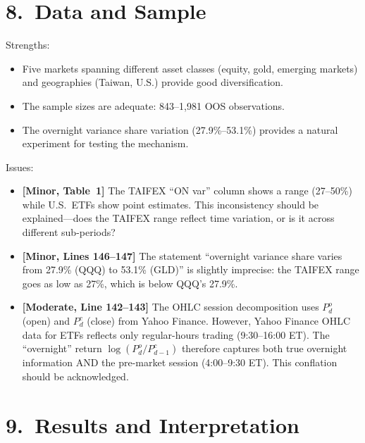 \documentclass[12pt,a4paper]{article}
\begin{document}
\bigskip

\section*{8.\ Data and Sample}

\noindent \textcolor{okgreen}{Strengths:}
\begin{itemize}[nosep]
\item Five markets spanning different asset classes (equity, gold, emerging markets) and geographies (Taiwan, U.S.) provide good diversification.
\item The sample sizes are adequate: 843--1,981 OOS observations.
\item The overnight variance share variation (27.9\%--53.1\%) provides a natural experiment for testing the mechanism.
\end{itemize}

\noindent Issues:
\begin{itemize}[nosep]
\item [L4] \textbf{[Minor, Table~1]} The TAIFEX ``ON var'' column shows a range (27--50\%) while U.S.\ ETFs show point estimates. This inconsistency should be explained---does the TAIFEX range reflect time variation, or is it across different sub-periods?
\item [L5] \textbf{[Minor, Lines 146--147]} The statement ``overnight variance share varies from 27.9\% (QQQ) to 53.1\% (GLD)'' is slightly imprecise: the TAIFEX range goes as low as 27\%, which is below QQQ's 27.9\%.
\item [\textcolor{warncolor}{M10}] \textbf{[Moderate, Line 142--143]} The OHLC session decomposition uses $P^o_d$ (open) and $P^c_d$ (close) from Yahoo Finance. However, Yahoo Finance OHLC data for ETFs reflects only regular-hours trading (9:30--16:00 ET). The ``overnight'' return $\log(P^o_d / P^c_{d-1})$ therefore captures both true overnight information AND the pre-market session (4:00--9:30 ET). This conflation should be acknowledged.
\end{itemize}

\bigskip

\section*{9.\ Results and Interpretation}
\end{document}
